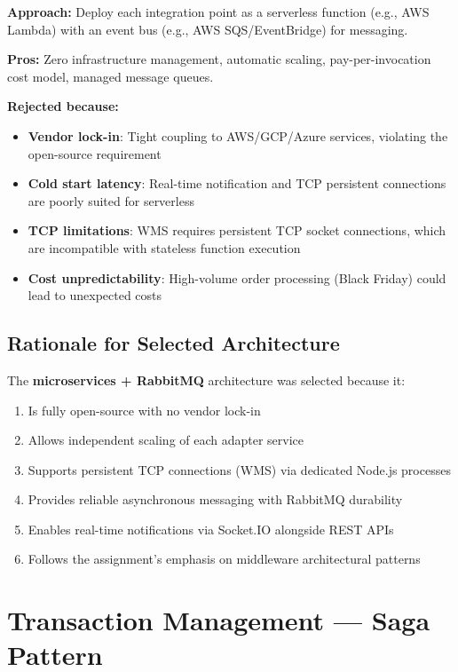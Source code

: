 \documentclass[12pt,a4paper]{article}
\begin{document}
\textbf{Approach:} Deploy each integration point as a serverless function (e.g., AWS Lambda) with an event bus (e.g., AWS SQS/EventBridge) for messaging.

\textbf{Pros:} Zero infrastructure management, automatic scaling, pay-per-invocation cost model, managed message queues.

\textbf{Rejected because:}
\begin{itemize}
  \item \textbf{Vendor lock-in}: Tight coupling to AWS/GCP/Azure services, violating the open-source requirement
  \item \textbf{Cold start latency}: Real-time notification and TCP persistent connections are poorly suited for serverless
  \item \textbf{TCP limitations}: WMS requires persistent TCP socket connections, which are incompatible with stateless function execution
  \item \textbf{Cost unpredictability}: High-volume order processing (Black Friday) could lead to unexpected costs
\end{itemize}

\subsection{Rationale for Selected Architecture}

The \textbf{microservices + RabbitMQ} architecture was selected because it:
\begin{enumerate}
  \item Is fully open-source with no vendor lock-in
  \item Allows independent scaling of each adapter service
  \item Supports persistent TCP connections (WMS) via dedicated Node.js processes
  \item Provides reliable asynchronous messaging with RabbitMQ durability
  \item Enables real-time notifications via Socket.IO alongside REST APIs
  \item Follows the assignment's emphasis on middleware architectural patterns
\end{enumerate}

\section{Transaction Management — Saga Pattern}
\end{document}
